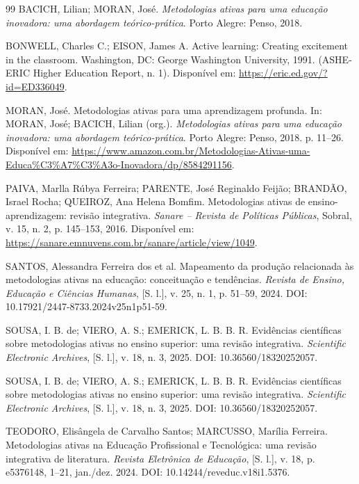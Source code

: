 \begin{thebibliography}{99}
BACICH, Lilian; MORAN, José. \textit{Metodologias ativas para uma educação inovadora: uma abordagem teórico-prática}. Porto Alegre: Penso, 2018.

BONWELL, Charles C.; EISON, James A. Active learning: Creating excitement in the classroom. Washington, DC: George Washington University, 1991. (ASHE-ERIC Higher Education Report, n. 1). Disponível em: \url{https://eric.ed.gov/?id=ED336049}.

MORAN, José. Metodologias ativas para uma aprendizagem profunda. In: MORAN, José; BACICH, Lilian (org.). \textit{Metodologias ativas para uma educação inovadora: uma abordagem teórico-prática}. Porto Alegre: Penso, 2018. p. 11--26. Disponível em: \url{https://www.amazon.com.br/Metodologias-Ativas-uma-Educa%C3%A7%C3%A3o-Inovadora/dp/8584291156}.

PAIVA, Marlla Rúbya Ferreira; PARENTE, José Reginaldo Feijão; BRANDÃO, Israel Rocha; QUEIROZ, Ana Helena Bomfim. Metodologias ativas de ensino-aprendizagem: revisão integrativa. \textit{Sanare -- Revista de Políticas Públicas}, Sobral, v. 15, n. 2, p. 145--153, 2016. Disponível em: \url{https://sanare.emnuvens.com.br/sanare/article/view/1049}.

SANTOS, Alessandra Ferreira dos et al. Mapeamento da produção relacionada às metodologias ativas na educação: conceituação e tendências. \textit{Revista de Ensino, Educação e Ciências Humanas}, [S. l.], v. 25, n. 1, p. 51--59, 2024. DOI: 10.17921/2447-8733.2024v25n1p51-59.

SOUSA, I. B. de; VIERO, A. S.; EMERICK, L. B. B. R. Evidências científicas sobre metodologias ativas no ensino superior: uma revisão integrativa. \textit{Scientific Electronic Archives}, [S. l.], v. 18, n. 3, 2025. DOI: 10.36560/18320252057.

SOUSA, I. B. de; VIERO, A. S.; EMERICK, L. B. B. R. Evidências científicas sobre metodologias ativas no ensino superior: uma revisão integrativa. \textit{Scientific Electronic Archives}, [S. l.], v. 18, n. 3, 2025. DOI: 10.36560/18320252057.

TEODORO, Elisângela de Carvalho Santos; MARCUSSO, Marília Ferreira. Metodologias ativas na Educação Profissional e Tecnológica: uma revisão integrativa de literatura. \textit{Revista Eletrônica de Educação}, [S. l.], v. 18, p. e5376148, 1--21, jan./dez. 2024. DOI: 10.14244/reveduc.v18i1.5376.


\end{thebibliography}
